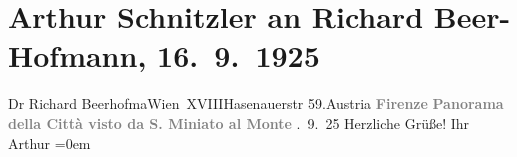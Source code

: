 

         
         \renewcommand{\erwaehntePersonen}{Personen: Richard Beer-Hofmann}
         \renewcommand{\erwaehnteOrte}{Orte: Florenz, Hasenauerstraße, San Miniato al Monte, Santa Maria Novella, Wien, XVIII., Währing, Österreich}
         \renewcommand{\erwaehnteWerke}{}
               \section[Arthur Schnitzler an Richard Beer-Hofmann, 16. 9. 1925]{ Arthur Schnitzler an Richard Beer-Hofmann, 16. 9. 1925}\nopagebreak{}\rehead{ }\begin{ledgroupsized}[t]{13cm}\normalsize\beginnumbering \toendnotes[C]{\smallbreak\pagebreak[2]} 
\toendnotes[C]{\smallbreak}\pstart{}{\pb}Dr Richard Beerhofma{\geminationn}\pend{}\pstart{}Wien XVIII\pend{}\pstart{}Hasenauerstr 59.\pend{}\pstart{}Austria\pend{}{\bigskip}\pstart
           \noindent{}\centering{}{\pb}\textcolor{gray}{\textbf{Firenze}}\pend
           \pstart
           \noindent{}\centering{}\textcolor{gray}{\textbf{Panorama della Città visto da S. Miniato al Monte}}\pend
           . 9. 25\pend
           \pstart
           Herzliche Grüße!\pend
           \pstart
           Ihr{\\[\baselineskip]}\spacefill\mbox{Arthur}\pend
           \leftskip=0em{}
         
         \endnumbering{}\end{ledgroupsized}  \newcommand{\dateiname}{L02448}\newcommand{\titel}{Arthur Schnitzler an Richard Beer-Hofmann, 16. 9. 1925}\newcommand{\editorInnen}{Martin Anton Müller und Gerd-Hermann Susen}
      